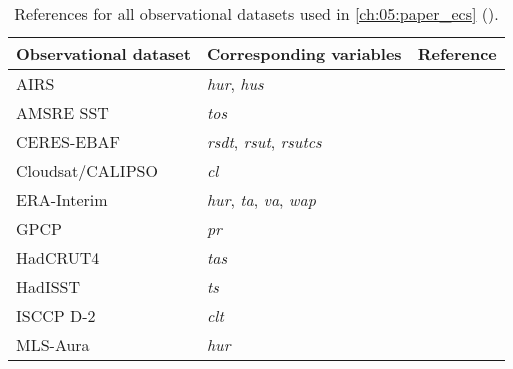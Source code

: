 \begin{table}[!b]
  \centering
  \begin{tabulary}{\columnwidth}{L L L}
    \toprule
    Observational dataset & Corresponding variables & Reference \\
    \midrule
    AIRS & \emph{hur}, \emph{hus} & \textcite{Aumann2003} \\
    AMSRE \ac{SST} & \emph{tos} & \textcite{AMSRE2011} \\
    CERES-EBAF & \emph{rsdt}, \emph{rsut}, \emph{rsutcs} & \textcite{Loeb2018}
    \\
    Cloudsat/CALIPSO & \emph{cl} & \textcite{Mace2009} \\
    ERA-Interim & \emph{hur}, \emph{ta}, \emph{va}, \emph{wap} &
    \textcite{Dee2011} \\
    GPCP & \emph{pr} & \textcite{Adler2003} \\
    HadCRUT4 & \emph{tas} & \textcite{Morice2012} \\
    HadISST & \emph{ts} & \textcite{Rayner2003} \\
    ISCCP D-2 & \emph{clt} & \textcite{Rossow1991} \\
    MLS-Aura & \emph{hur} & \textcite{Beer2006} \\
    \bottomrule
  \end{tabulary}
  \caption{References for all observational datasets used in
    \cref{ch:05:paper_ecs} ().}
  \label{tab:app:a:observations}
\end{table}

